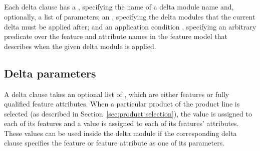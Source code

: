 \begin{abssyntax}
    \\
    \\
    \\
    \medskip
    \\
    \\
    \\
    \\
    \\
    \\
    \concrCont{ \fid } 
\end{abssyntax}
%
Each delta clause has a , specifying the name of a delta module
name and, optionally, a list of parameters; an , specifying the
delta modules that the current delta must be applied after; and an application
condition , specifying an arbitrary predicate over the feature and
attribute names in the feature model that describes when the given delta module
is applied.

\subsection{Delta parameters} \label{sec:delta parameters}
A delta clause takes an optional list of , which are either
features or fully qualified feature attributes. When a particular
product of the product line is selected (as described in
Section~\ref{sec:product selection}), the value  is assigned to each of
its features and a value is assigned to each of its features' attributes.
These values can be used inside the delta module if the corresponding delta clause
specifies the feature or feature attribute as one of its parameters.


